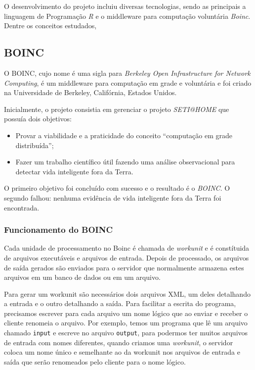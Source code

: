 O desenvolvimento do projeto incluiu diversas tecnologias, sendo as principais a linguagem de Programação \emph{R} e o middleware
para computação voluntária \emph{Boinc}. Dentre os conceitos estudados, 

\subsection{BOINC}


O BOINC, cujo nome é uma sigla para \textit{Berkeley Open Infrastructure for Network Computing}, é um middleware 
para computação em grade e voluntária e foi criado na Universidade de Berkeley, Califórnia, Estados Unidos.

Inicialmente, o projeto consistia em gerenciar o projeto \textit{SETI@HOME} que possuía dois objetivos:

\begin{itemize}
	\item Provar a viabilidade e a praticidade do conceito ``computação em grade distribuída'';
	\item Fazer um trabalho científico útil fazendo uma análise observacional para detectar vida inteligente fora da Terra.
\end{itemize}

O primeiro objetivo foi concluído com sucesso e o resultado é o \textit{BOINC}. O segundo falhou: nenhuma evidência de 
vida inteligente fora da Terra foi encontrada. 

\subsubsection{Funcionamento do BOINC}

Cada unidade de processamento no Boinc é chamada de \emph{workunit} e é constítuida de arquivos executáveis e 
arquivos de entrada. Depois de processado, os arquivos de saída gerados são enviados para o servidor que
normalmente armazena estes arquivos em um banco de dados ou em um arquivo.

Para gerar um workunit são necessários dois arquivos XML, um deles detalhando a entrada e o 
outro detalhando a saída. Para facilitar a escrita do programa, precisamos escrever para cada arquivo um nome lógico 
que ao enviar e receber o cliente renomeia o arquivo. Por exemplo, temos um programa que lê um arquivo chamado 
\verb#input# e escreve no arquivo \verb#output#, para podermos ter muitos arquivos de entrada com nomes diferentes, quando
criamos uma \emph{workunit}, o servidor coloca um nome único e semelhante ao da workunit nos arquivos de entrada e saída que serão renomeados
pelo cliente para o nome lógico.


